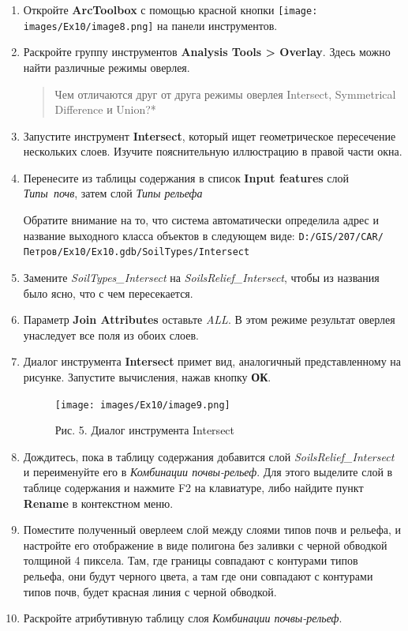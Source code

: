\documentclass[12pt,]{book}
\begin{document}
\begin{enumerate}
\def\labelenumi{\arabic{enumi}.}
\item
  Откройте \textbf{ArcToolbox} с помощью красной кнопки \texttt{[image: images/Ex10/image8.png]} на панели инструментов.
\item
  Раскройте группу инструментов \textbf{Analysis Tools \textgreater{} Overlay}. Здесь можно найти различные режимы оверлея.

  \begin{quote}
  Чем отличаются друг от друга режимы оверлея Intersect, Symmetrical Difference и Union?*
  \end{quote}
\item
  Запустите инструмент \textbf{Intersect}, который ищет геометрическое пересечение нескольких слоев. Изучите пояснительную иллюстрацию в правой части окна.
\item
  Перенесите из таблицы содержания в список \textbf{Input features} слой \emph{Типы~почв}, затем слой \emph{Типы рельефа}

  Обратите внимание на то, что система автоматически определила адрес и
  название выходного класса объектов в следующем виде:
  \texttt{D:/GIS/207/CAR/Петров/Ex10/Ex10.gdb/SoilTypes/Intersect}
\item
  Замените \emph{SoilTypes\_Intersect} на \emph{SoilsRelief\_Intersect}, чтобы из названия было ясно, что с чем пересекается.
\item
  Параметр \textbf{Join Attributes} оставьте \emph{ALL}. В этом режиме результат оверлея унаследует все поля из обоих слоев.
\item
  Диалог инструмента \textbf{Intersect} примет вид, аналогичный представленному на рисунке. Запустите вычисления, нажав кнопку \textbf{ОК}.

  \begin{figure}
  \centering
  \texttt{[image: images/Ex10/image9.png]}
  \caption{Рис. 5. Диалог инструмента Intersect}
  \end{figure}
\item
  Дождитесь, пока в таблицу содержания добавится слой \emph{SoilsRelief\_Intersect} и переименуйте его в \emph{Комбинации почвы-рельеф}. Для этого выделите слой в таблице содержания и нажмите F2 на клавиатуре, либо найдите пункт \textbf{Rename} в контекстном меню.
\item
  Поместите полученный оверлеем слой между слоями типов почв и рельефа, и настройте его отображение в виде полигона без заливки с черной обводкой толщиной 4 пиксела. Там, где границы совпадают с контурами типов рельефа, они будут черного цвета, а там где они совпадают с контурами типов почв, будет красная линия с черной обводкой.
\item
  Раскройте атрибутивную таблицу слоя \emph{Комбинации почвы-рельеф}.
\end{enumerate}
\end{document}

